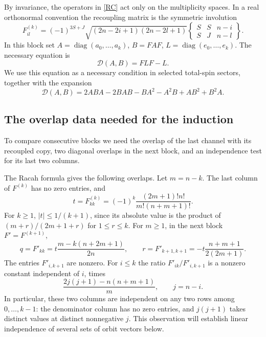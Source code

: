 \documentclass[11pt]{article}
\newcommand{\DD}{\mathcal D}
\DeclareMathOperator{\diag}{diag}
\begin{document}
By invariance, the operators in \eqref{RC} act only on the multiplicity spaces. In a real orthonormal convention the recoupling matrix is the symmetric involution
\begin{equation}\label{F}
 F^{(k)}_{il}=(-1)^{3S+J}\sqrt{(2n-2i+1)(2n-2l+1)}
 \begin{Bmatrix} S&S&n-i\\ S&J&n-l\end{Bmatrix}.
\end{equation}
In this block set $A=\diag(a_0,\ldots,a_k)$, $B=FAF$, $L=\diag(e_0,\ldots,e_k)$. The necessary equation is
\begin{equation}\label{block}
 \DD(A,B)=FLF-L.
\end{equation}
We use this equation as a necessary condition in selected total-spin sectors, together with the expansion
\begin{equation}\label{expand}
 \DD(A,B)=2ABA-2BAB-BA^2-A^2B+AB^2+B^2A.
\end{equation}

\subsection{The overlap data needed for the induction}
To compare consecutive blocks we need the overlap of the last channel with its recoupled copy, two diagonal overlaps in the next block, and an independence test for its last two columns.

The Racah formula gives the following overlaps. Let $m=n-k$. The last column of $F^{(k)}$ has no zero entries, and
\begin{equation}\label{t}
 t=F^{(k)}_{kk}=(-1)^k\frac{(2m+1)!n!}{m!(n+m+1)!}.
\end{equation}
For $k\ge1$, $|t|\le1/(k+1)$, since its absolute value is the product of $(m+r)/(2m+1+r)$ for $1\le r\le k$. For $m\ge1$, in the next block $F'=F^{(k+1)}$,
\begin{equation}\label{qr}
 q=F'_{kk}=t\frac{m-k(n+2m+1)}{2n},\qquad
 r=F'_{k+1,k+1}=-t\frac{n+m+1}{2(2m+1)}.
\end{equation}
The entries $F'_{i,k+1}$ are nonzero. For $i\le k$ the ratio $F'_{ik}/F'_{i,k+1}$ is a nonzero constant independent of $i$, times
\begin{equation}\label{ratio}
 \frac{2j(j+1)-n(n+m+1)}m,\qquad j=n-i.
\end{equation}
In particular, these two columns are independent on any two rows among $0,\ldots,k-1$: the denominator column has no zero entries, and $j(j+1)$ takes distinct values at distinct nonnegative $j$. This observation will establish linear independence of several sets of orbit vectors below.
\end{document}
